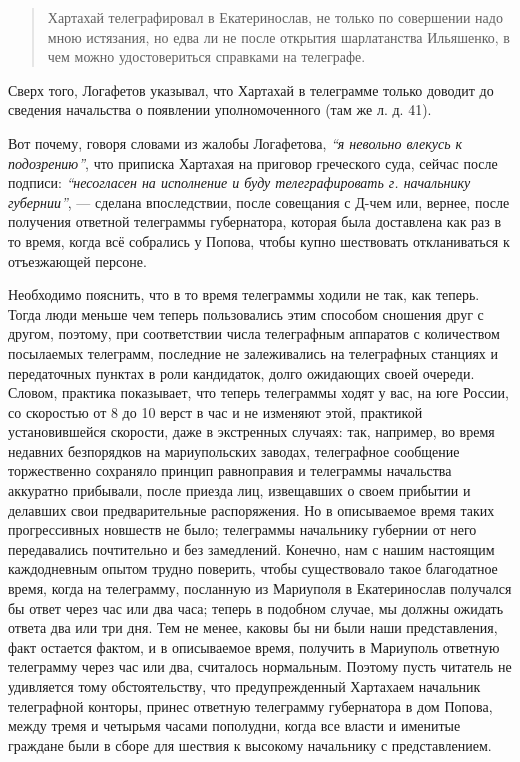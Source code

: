 \documentclass[a4paper,20pt]{report}
\begin{document}
\begin{quote}
\em\bfseries

Хартахай телеграфировал в Екатеринослав, не только по совершении надо мною
истязания, но едва ли не после открытия шарлатанства Ильяшенко, в чем
можно удостовериться справками на телеграфе.  

\end{quote}

Сверх того, Логафетов указывал, что Хартахай в телеграмме только доводит до сведения начальства о появлении уполномоченного
(там же л. д. 41).

Вот почему, говоря словами из жалобы Логафетова,
\emph{``я невольно влекусь к подозрению''}, что приписка Хартахая
на приговор греческого суда, сейчас после подписи: \emph{``несогласен на исполнение и буду телеграфировать 
г. начальнику губернии''}, — сделана впоследствии, после совещания с
Д-чем или, вернее, после получения ответной телеграммы
губернатора, которая была доставлена как раз в то время,
когда всё собрались у Попова, чтобы купно шествовать откланиваться к отъезжающей персоне.

Необходимо пояснить, что в то время телеграммы ходили не так, как теперь. 
Тогда люди меньше чем теперь пользовались этим способом сношения друг с другом,
поэтому, при соответствии числа телеграфным аппаратов с
количеством посылаемых телеграмм, последние не залеживались на телеграфных станциях 
и передаточных пунктах в роли кандидаток, долго ожидающих своей очереди.
Словом, практика показывает, что теперь телеграммы ходят у вас, на юге России, 
со скоростью от 8 до 10 верст в час и не изменяют этой, практикой установившейся скорости, 
даже в экстренных случаях: так, например, во время недавних безпорядков на 
мариупольских заводах, телеграфное сообщение торжественно сохраняло
принцип равноправия и телеграммы начальства аккуратно
прибывали, после приезда лиц, извещавших о своем прибытии
и делавших свои предварительные распоряжения. Но
в описываемое время таких прогрессивных новшеств не
было; телеграммы начальнику губернии от него передавались 
почтительно и без замедлений. Конечно, нам с нашим настоящим каждодневным 
опытом трудно поверить,
чтобы существовало такое благодатное время, когда на телеграмму, посланную из Мариуполя в 
Екатеринослав получался бы ответ через час или два часа; 
теперь в подобном случае, мы должны ожидать ответа два или три
дня. Тем не менее, каковы бы ни были наши представления,
факт остается фактом, и в описываемое время, получить
в Мариуполь ответную телеграмму через час или два,
считалось нормальным. Поэтому пусть читатель не удивляется 
тому обстоятельству, что предупрежденный Хартахаем
начальник телеграфной конторы, принес ответную телеграмму 
губернатора в дом Попова, между тремя и четырьмя
часами пополудни, когда все власти и именитые граждане
были в сборе для шествия к высокому начальнику с
представлением.
\end{document}
